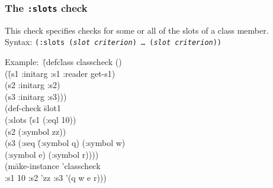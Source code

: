 \subsubsection{The \texttt{:slots} check} 
This check specifies checks for some or all of the slots of a class
member.
\\ Syntax: \texttt{(:slots  (\textit{slot} \textit{criterion})  \ldots\ (\textit{slot} \textit{criterion}))}
{\ttfamily\begin{tabbing}
\textrm{Example:}\ \= (defc\=lass classcheck ()
\\ \> \> (\=(s1 :initarg :s1 :reader get-s1)
\\ \> \> \> (s2 :initarg :s2)
\\ \> \> \> (s3 :initarg :s3)))
\\ \> (def-check \=slot1
\\ \> \>  (:slots \=(s1 (:eql 10))
\\ \> \>  \>(s2 (:symbol zz))
\\ \> \>  \>(s3 (:seq \=(:symbol q) (:symbol w)
\\ \> \>  \> \> (:symbol e) (:symbol r))))
\\ \> \>  (m\=ake-instance 'classcheck
\\ \> \> \>  :s1 10 :s2 'zz :s3 '(q w e r)))
\end{tabbing}}

